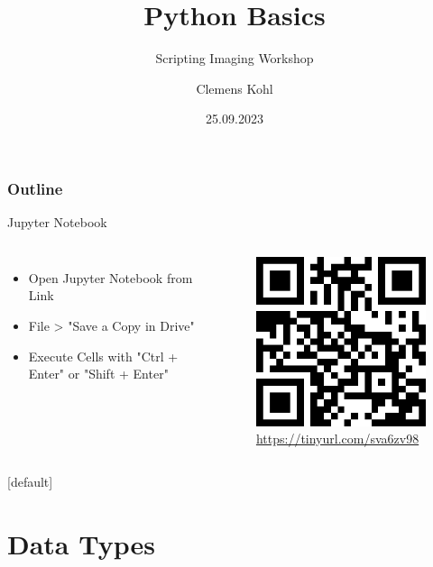 \documentclass[compress%
,aspectratio=169%
]{beamer}
\title{Python Basics}
\subtitle{Scripting Imaging Workshop}
\author{Clemens Kohl}
\institute{Max Planck Institute for Molecular Genetics}
\date{25.09.2023}
\begin{document}
\maketitle

\begin{frame}
	\frametitle{Outline}
	\tableofcontents[hideallsubsections]
\end{frame}

\begin{frame}{Jupyter Notebook}
\begin{columns}
    \begin{itemize}
    \item Open Jupyter Notebook from Link
    \item File > "Save a Copy in Drive"
    \item Execute Cells with "Ctrl + Enter" or "Shift + Enter"
\end{itemize}
    \begin{figure}
    \centering
    \includegraphics[width = 0.7\linewidth]{mpimgbeamertheme/img/link.png}
    \caption{\alert{\url{https://tinyurl.com/sva6zv98}}}
\end{figure}
\end{columns}
\end{frame}
[default]

\section{Data Types}
\end{document}
